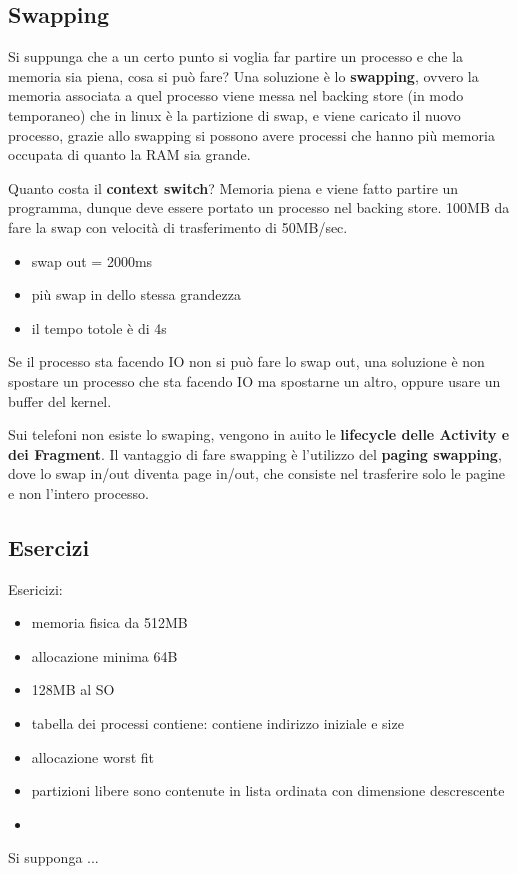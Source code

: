 \documentclass[12pt]{article}
\begin{document}
\subsection{Swapping}
Si suppunga che a un certo punto si voglia far partire un processo e che la memoria sia piena, cosa si pu\`o fare? Una soluzione \`e lo \textbf{swapping}, ovvero la memoria associata a quel processo viene messa nel backing store (in modo temporaneo) che in linux \`e la partizione di swap, e viene caricato il nuovo processo, grazie allo swapping si possono avere processi che hanno pi\`u memoria occupata di quanto la RAM sia grande.
\begin{example}{}{}
  Quanto costa il \textbf{context switch}? Memoria piena e viene fatto partire un programma, dunque deve essere portato un processo nel backing store. 100MB da fare la swap con velocit\`a di trasferimento di 50MB/sec.
  \begin{itemize}
    \item swap out = 2000ms
    \item pi\`u swap in dello stessa grandezza
    \item il tempo totole \`e di 4s
  \end{itemize}
  Se il processo sta facendo IO non si pu\`o fare lo swap out, una soluzione \`e non spostare un processo che sta facendo IO ma spostarne un altro, oppure usare un buffer del kernel.
\end{example}
Sui telefoni non esiste lo swaping, vengono in auito le \textbf{lifecycle delle Activity e dei Fragment}. Il vantaggio di fare swapping \`e l'utilizzo del \textbf{paging swapping}, dove lo swap in/out diventa page in/out, che consiste nel trasferire solo le pagine e non l'intero processo.

\subsection{Esercizi}
Esericizi:
\begin{example}{}{}
  \begin{itemize}
    \item memoria fisica da 512MB
    \item allocazione minima 64B
    \item 128MB al SO
    \item tabella dei processi contiene: contiene indirizzo iniziale e size
    \item allocazione worst fit
    \item partizioni libere sono contenute in lista ordinata con dimensione descrescente
    \item 
  \end{itemize}
  Si supponga ...
\end{example}
\end{document}
